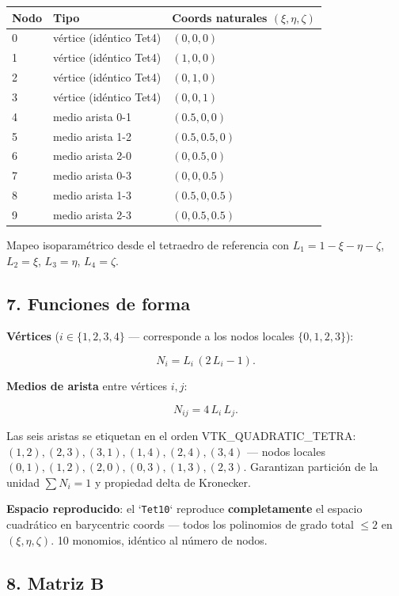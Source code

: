 \documentclass[11pt,letterpaper,oneside]{report}
\begin{document}
\begin{center}
\begin{tabularx}{\textwidth}{YYY}
\hline
\textbf{Nodo} & \textbf{Tipo} & \textbf{Coords naturales $(\xi, \eta, \zeta)$} \\
 & vértice (idéntico Tet4) & $(0, 0, 0)$ \\
1 & vértice (idéntico Tet4) & $(1, 0, 0)$ \\
2 & vértice (idéntico Tet4) & $(0, 1, 0)$ \\
3 & vértice (idéntico Tet4) & $(0, 0, 1)$ \\
4 & medio arista 0-1 & $(0.5, 0, 0)$ \\
5 & medio arista 1-2 & $(0.5, 0.5, 0)$ \\
6 & medio arista 2-0 & $(0, 0.5, 0)$ \\
7 & medio arista 0-3 & $(0, 0, 0.5)$ \\
8 & medio arista 1-3 & $(0.5, 0, 0.5)$ \\
9 & medio arista 2-3 & $(0, 0.5, 0.5)$ \\
\hline
\end{tabularx}
\end{center}
Mapeo isoparamétrico desde el tetraedro de referencia con $L_1 = 1 - \xi - \eta - \zeta$, $L_2 = \xi$, $L_3 = \eta$, $L_4 = \zeta$.

\subsection{7. Funciones de forma}

\textbf{Vértices} ($i \in \{1, 2, 3, 4\}$ --- corresponde a los nodos locales $\{0, 1, 2, 3\}$):

\[
N_i = L_i\,(2\,L_i - 1).
\]

\textbf{Medios de arista} entre vértices $i, j$:

\[
N_{ij} = 4\,L_i\,L_j.
\]

Las seis aristas se etiquetan en el orden VTK\_QUADRATIC\_TETRA: $(1,2), (2,3), (3,1), (1,4), (2,4), (3,4)$ --- nodos locales $(0,1), (1,2), (2,0), (0,3), (1,3), (2,3)$. Garantizan partición de la unidad $\sum N_i = 1$ y propiedad delta de Kronecker.

\textbf{Espacio reproducido}: el `\texttt{Tet10}` reproduce \textbf{completamente} el espacio cuadrático en barycentric coords --- todos los polinomios de grado total $\le 2$ en $(\xi, \eta, \zeta)$. 10 monomios, idéntico al número de nodos.

\subsection{8. Matriz $\mathbf B$}
\end{document}
